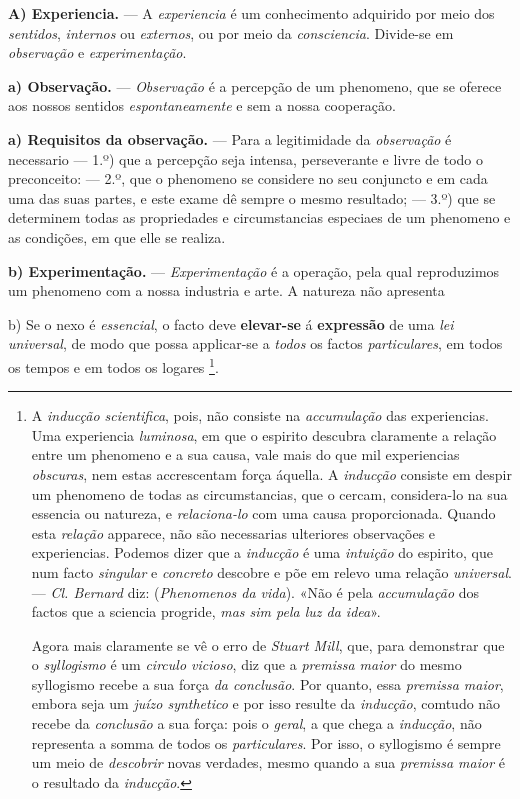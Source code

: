 \textbf{A) Experiencia.} --- A \emph{experiencia} é um conhecimento adquirido por meio dos \emph{sentidos}, \emph{internos} ou \emph{externos}, ou por meio da \emph{consciencia}. Divide-se em \emph{observação} e \emph{experimentação}.

\textbf{a) Observação.} --- \emph{Observação} é a percepção de um phenomeno, que se oferece aos nossos sentidos \emph{espontaneamente} e sem a nossa cooperação.

\textbf{a) Requisitos da observação.} --- Para a legitimidade da \emph{observação} é necessario --- 1.º) que a percepção seja intensa, perseverante e livre de todo o preconceito: --- 2.º, que o phenomeno se considere no seu conjuncto e em cada uma das suas partes, e este exame dê sempre o mesmo resultado; --- 3.º) que se determinem todas as propriedades e circumstancias especiaes de um phenomeno e as condições, em que elle se realiza.

\textbf{b) Experimentação.} --- \emph{Experimentação} é a operação, pela qual reproduzimos um phenomeno com a nossa industria e arte. A natureza não apresenta

b) Se o nexo é \emph{essencial}, o facto deve \textbf{elevar-se} á \textbf{expressão} de uma \emph{lei universal}, de modo que possa applicar-se a \emph{todos} os factos \emph{particulares}, em todos os tempos e em todos os logares \footnote{A \emph{inducção scientifica}, pois, não consiste na \emph{accumulação} das experiencias. Uma experiencia \emph{luminosa}, em que o espirito descubra claramente a relação entre um phenomeno e a sua causa, vale mais do que mil experiencias \emph{obscuras}, nem estas accrescentam força áquella. A \emph{inducção} consiste em despir um phenomeno de todas as circumstancias, que o cercam, considera-lo na sua essencia ou natureza, e \emph{relaciona-lo} com uma causa proporcionada. Quando esta \emph{relação} apparece, não são necessarias ulteriores observações e experiencias. Podemos dizer que a \emph{inducção} é uma \emph{intuição} do espirito, que num facto \emph{singular} e \emph{concreto} descobre e põe em relevo uma relação \emph{universal}. --- \emph{Cl. Bernard} diz: (\emph{Phenomenos da vida}). «Não é pela \emph{accumulação} dos factos que a sciencia progride, \emph{mas sim pela luz da idea}».\par Agora mais claramente se vê o erro de \emph{Stuart Mill}, que, para demonstrar que o \emph{syllogismo} é um \emph{circulo vicioso}, diz que a \emph{premissa maior} do mesmo syllogismo recebe a sua força \emph{da conclusão}. Por quanto, essa \emph{premissa maior}, embora seja um \emph{juízo synthetico} e por isso resulte da \emph{inducção}, comtudo não recebe da \emph{conclusão} a sua força: pois o \emph{geral}, a que chega a \emph{inducção}, não representa a somma de todos os \emph{particulares}. Por isso, o syllogismo é sempre um meio de \emph{descobrir} novas verdades, mesmo quando a sua \emph{premissa maior} é o resultado da \emph{inducção}.}.

